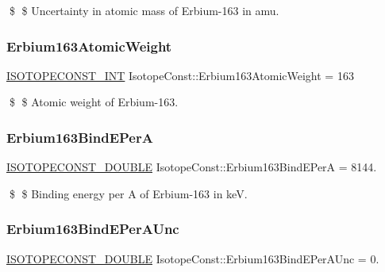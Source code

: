 \$ \$ Uncertainty in atomic mass of Erbium-\/163 in amu. \mbox{\label{group___isotope_const-_erbium-_er163_gae7fe91e879e50e2ff54ef101b713c260}} 
\subsubsection{\texorpdfstring{Erbium163\+Atomic\+Weight}{Erbium163AtomicWeight}}
{\footnotesize\ttfamily \mbox{\hyperlink{group___isotope_const-_macros_ga5f18360b3e99483a35c32d789e62621c}{I\+S\+O\+T\+O\+P\+E\+C\+O\+N\+S\+T\+\_\+\+I\+NT}} Isotope\+Const\+::\+Erbium163\+Atomic\+Weight = 163}

\$ \$ Atomic weight of Erbium-\/163. \mbox{\label{group___isotope_const-_erbium-_er163_ga8630aef5fa6f0d60e457b35ded5ef26f}} 
\subsubsection{\texorpdfstring{Erbium163\+Bind\+E\+PerA}{Erbium163BindEPerA}}
{\footnotesize\ttfamily \mbox{\hyperlink{group___isotope_const-_macros_ga8f45a7272ce02c0b4c65c44636ed719a}{I\+S\+O\+T\+O\+P\+E\+C\+O\+N\+S\+T\+\_\+\+D\+O\+U\+B\+LE}} Isotope\+Const\+::\+Erbium163\+Bind\+E\+PerA = 8144.}

\$ \$ Binding energy per A of Erbium-\/163 in keV. \mbox{\label{group___isotope_const-_erbium-_er163_ga2623670cc1d7aeb1108e191a87fc6184}} 
\subsubsection{\texorpdfstring{Erbium163\+Bind\+E\+Per\+A\+Unc}{Erbium163BindEPerAUnc}}
{\footnotesize\ttfamily \mbox{\hyperlink{group___isotope_const-_macros_ga8f45a7272ce02c0b4c65c44636ed719a}{I\+S\+O\+T\+O\+P\+E\+C\+O\+N\+S\+T\+\_\+\+D\+O\+U\+B\+LE}} Isotope\+Const\+::\+Erbium163\+Bind\+E\+Per\+A\+Unc = 0.}

